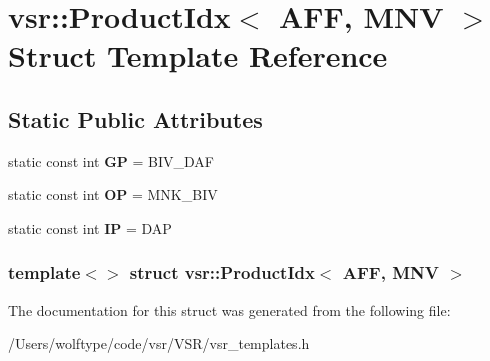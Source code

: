 \hypertarget{structvsr_1_1_product_idx_3_01_a_f_f_00_01_m_n_v_01_4}{\section{vsr\-:\-:Product\-Idx$<$ A\-F\-F, M\-N\-V $>$ Struct Template Reference}
\label{structvsr_1_1_product_idx_3_01_a_f_f_00_01_m_n_v_01_4}
}
\subsection*{Static Public Attributes}
\begin{DoxyCompactItemize}
\item 
\hypertarget{structvsr_1_1_product_idx_3_01_a_f_f_00_01_m_n_v_01_4_ac26b788eb4107bc86f36ffe5e4cb19ce}{static const int {\bfseries G\-P} = B\-I\-V\-\_\-\-D\-A\-F}\label{structvsr_1_1_product_idx_3_01_a_f_f_00_01_m_n_v_01_4_ac26b788eb4107bc86f36ffe5e4cb19ce}

\item 
\hypertarget{structvsr_1_1_product_idx_3_01_a_f_f_00_01_m_n_v_01_4_a9f2ad55f10651ef10c1f947291b6cb2b}{static const int {\bfseries O\-P} = M\-N\-K\-\_\-\-B\-I\-V}\label{structvsr_1_1_product_idx_3_01_a_f_f_00_01_m_n_v_01_4_a9f2ad55f10651ef10c1f947291b6cb2b}

\item 
\hypertarget{structvsr_1_1_product_idx_3_01_a_f_f_00_01_m_n_v_01_4_afc44b0ffa66889e9b284d33fb6c3be3f}{static const int {\bfseries I\-P} = D\-A\-P}\label{structvsr_1_1_product_idx_3_01_a_f_f_00_01_m_n_v_01_4_afc44b0ffa66889e9b284d33fb6c3be3f}

\end{DoxyCompactItemize}
\subsubsection*{template$<$$>$ struct vsr\-::\-Product\-Idx$<$ A\-F\-F, M\-N\-V $>$}



The documentation for this struct was generated from the following file\-:\begin{DoxyCompactItemize}
\item 
/\-Users/wolftype/code/vsr/\-V\-S\-R/vsr\-\_\-templates.\-h\end{DoxyCompactItemize}
